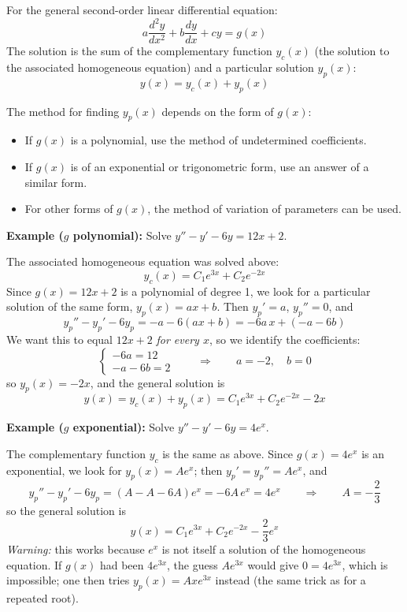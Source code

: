 \documentclass[]{article}
\begin{document}
	For the general second-order linear differential equation:
	$$
	a\frac{d^2y}{dx^2} + b\frac{dy}{dx} + cy = g(x)
	$$
	The solution is the sum of the complementary function $y_c(x)$
	(the solution to the associated homogeneous equation)
	and a particular solution $y_p(x)$:
	$$
	y(x) = y_c(x) + y_p(x)
	$$
	
	The method for finding $y_p(x)$ depends on the form of $g(x)$:
	\begin{itemize}
		\item If $g(x)$ is a polynomial, use the method of undetermined coefficients.
		\item If $g(x)$ is of an exponential or trigonometric form, use an answer of a similar form.
		\item For other forms of $g(x)$, the method of variation of parameters can be used.
	\end{itemize}

	\noindent \textbf{Example ($g$ polynomial):}
	Solve $y'' - y' - 6y = 12x + 2$.

	The associated homogeneous equation was solved above:
	$$
	y_c(x) = C_1 e^{3x} + C_2 e^{-2x}
	$$
	Since $g(x) = 12x + 2$ is a polynomial of degree 1, we look for a particular solution of the same form, $y_p(x) = ax + b$.
	Then $y_p' = a$, $y_p'' = 0$, and
	$$
	y_p'' - y_p' - 6y_p = -a - 6(ax + b) = -6a \, x + (-a - 6b)
	$$
	We want this to equal $12x + 2$ \textit{for every $x$}, so we identify the coefficients:
	$$
	\begin{cases}
		-6a = 12 \\
		-a - 6b = 2
	\end{cases}
	\qquad \Longrightarrow \qquad
	a = -2, \quad b = 0
	$$
	so $y_p(x) = -2x$, and the general solution is
	$$
	y(x) = y_c(x) + y_p(x) = C_1 e^{3x} + C_2 e^{-2x} - 2x
	$$

	\noindent \textbf{Example ($g$ exponential):}
	Solve $y'' - y' - 6y = 4e^{x}$.

	The complementary function $y_c$ is the same as above.
	Since $g(x) = 4e^x$ is an exponential, we look for $y_p(x) = A e^{x}$; then $y_p' = y_p'' = Ae^x$, and
	$$
	y_p'' - y_p' - 6y_p = (A - A - 6A) e^{x} = -6A \, e^{x} = 4 e^{x}
	\qquad \Longrightarrow \qquad
	A = -\frac{2}{3}
	$$
	so the general solution is
	$$
	y(x) = C_1 e^{3x} + C_2 e^{-2x} - \frac{2}{3} e^{x}
	$$
	\textit{Warning:} this works because $e^{x}$ is not itself a solution of the homogeneous equation.
	If $g(x)$ had been $4e^{3x}$, the guess $Ae^{3x}$ would give $0 = 4e^{3x}$, which is impossible; one then tries $y_p(x) = Ax e^{3x}$ instead (the same trick as for a repeated root).
\end{document}
